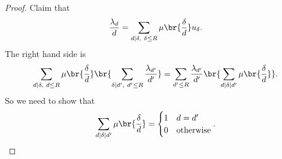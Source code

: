 \begin{proof}

Claim that
\begin{equation}
\label{eq:8}
\dfrac{\lambda_d}{d} = \sum_{d \mid \delta, \ \delta \le R} \mu\br{\dfrac{\delta}{d}}u_\delta.
\end{equation}
The right hand side is
$$ \sum_{d \mid \delta, \ d \le R} \mu\br{\dfrac{\delta}{d}}\br{\sum_{\delta \mid d', \ d' \le R} \dfrac{\lambda_{d'}}{d'}} = \sum_{d' \le R} \dfrac{\lambda_{d'}}{d'}\br{\sum_{d \mid \delta \mid d'} \mu\br{\dfrac{\delta}{d}}}. $$
So we need to show that
$$ \sum_{d \mid \delta \mid d'} \mu\br{\dfrac{\delta}{d}} =
\begin{cases}
1 & d = d' \\
0 & \text{otherwise}
\end{cases}.
$$

\pagebreak


\end{proof}
